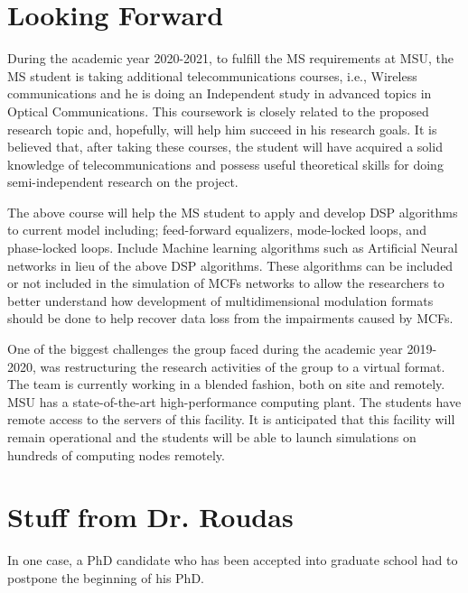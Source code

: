 \documentclass{report}
\begin{document}
\section{Looking Forward}
 During the academic year 2020-2021, to fulfill the MS requirements at MSU, the MS student is taking additional telecommunications courses, i.e., Wireless communications and he is doing an Independent study in advanced topics in Optical Communications. This coursework is closely related to the proposed research topic and, hopefully, will help him succeed in his research goals. It is believed that, after taking these courses, the student will have acquired a solid knowledge of telecommunications and possess useful theoretical skills for doing semi-independent research on the project.

The above course will help the MS student to apply and develop DSP algorithms to current model including; feed-forward equalizers, mode-locked loops, and phase-locked loops. Include Machine learning algorithms such as Artificial Neural networks in lieu of the above DSP algorithms. These algorithms can be included or not included in the simulation of MCFs networks to allow the researchers to better understand how development of multidimensional modulation formats should be done to help recover data loss from the impairments caused by MCFs.

One of the biggest challenges the group faced during the academic year 2019-2020, was restructuring the research activities of the group to a virtual format. The team is currently working in a blended fashion, both on site and remotely. MSU has a state-of-the-art high-performance computing plant. The students have remote access to the servers of this facility. It is anticipated that this facility will remain operational and the students will be able to launch simulations on hundreds of computing nodes remotely.


\section{Stuff from Dr. Roudas}
In one case, a PhD candidate who has been accepted into graduate school had to postpone the beginning of his PhD.




\end{document}
